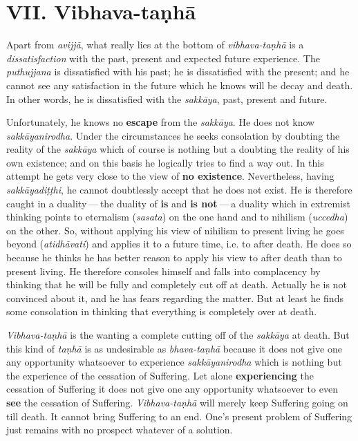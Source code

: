 \hypertarget{x-vii.-vibhava-taṇhā}{\section*{VII. Vibhava-taṇhā}}
\label{vibhava-tanha}Apart from \emph{avijjā}, what really lies at the bottom of \emph{vibhava-taṇhā} is
a \emph{dissatisfaction} with the past, present and expected future experience.
The \emph{puthujjana} is dissatisfied with his past; he is dissatisfied with
the present; and he cannot see any satisfaction in the future which he
knows will be decay and death. In other words, he is dissatisfied with
the \emph{sakkāya}, past, present and future.


Unfortunately, he knows no \textbf{escape} from the \emph{sakkāya}. He does not know
\emph{sakkāyanirodha}. Under the circumstances he seeks consolation by doubting
the reality of the \emph{sakkāya} which of course is nothing but a doubting the
reality of his own existence; and on this basis he logically tries to
find a way out. In this attempt he gets very close to the view of \textbf{no existence}.
Nevertheless, having \emph{sakkāyadiṭṭhi}, he cannot doubtlessly
accept that he does not exist. He is therefore caught in a duality — the
duality of \textbf{is} and \textbf{is not} — a duality which in extremist thinking points
to eternalism (\emph{sasata}) on the one hand and to nihilism (\emph{uccedha}) on the
other. So, without applying his view of nihilism to present living he
goes beyond (\emph{atidhāvati}) and applies it to a future time, i.e. to after
death. He does so because he thinks he has better reason to apply his
view to after death than to present living. He therefore consoles
himself and falls into complacency by thinking that he will be fully and
completely cut off at death. Actually he is not convinced about it, and
he has fears regarding the matter. But at least he finds some
consolation in thinking that everything is completely over at death.


\emph{Vibhava-taṇhā} is the wanting a complete cutting off of the \emph{sakkāya} at
death. But this kind of \emph{taṇhā} is as undesirable as \emph{bhava-taṇhā} because
it does not give one any opportunity whatsoever to experience
\emph{sakkāyanirodha} which is nothing but the experience of the cessation of
Suffering. Let alone \textbf{experiencing} the cessation of Suffering it does not
give one any opportunity whatsoever to even \textbf{see} the cessation of
Suffering. \emph{Vibhava-taṇhā} will merely keep Suffering going on till death.
It cannot bring Suffering to an end. One’s present problem of Suffering
just remains with no prospect whatever of a solution.


